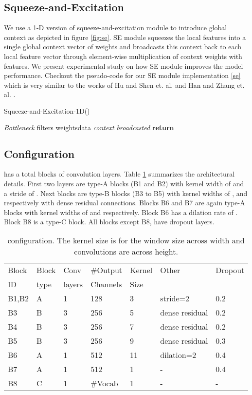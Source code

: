 \documentclass{article}
\begin{document}
\subsection{Squeeze-and-Excitation}
We use a 1-D version of squeeze-and-excitation module to introduce global context as depicted in figure \ref{fig:se}. SE module squeezes the local features into a single global context vector of weights and broadcasts this context back to each local feature vector through element-wise multiplication of context weights with features. We present experimental study on how SE module improves the model performance. Checkout the pseudo-code for our SE module implementation \ref{se} which is very similar to the works of Hu and Shen et. al.\cite{hu2018squeeze} and Han and Zhang et. al. \cite{han2020contextnet}.

    
\begin{algorithm}
\caption{Squeeze-and-Excitation-1D()}\label{se}
\begin{algorithmic}[1]
\State 
\State {}
\Comment \emph{Bottleneck}
\State 
\State filters
\State 
\State weightsdata
\Comment \emph{context broadcasted}
\State \textbf{return} {}
\EndProcedure
\end{algorithmic}
\end{algorithm}


\subsection{Configuration}
 has a total  blocks of convolution layers. Table \ref{tab:config_table} summarizes the architectural details. First two layers are type-A blocks (B1 and B2) with kernel width of  and a stride of . Next  blocks are type-B blocks (B3 to B5) with kernel widths of ,  and  respectively with dense residual connections. Blocks B6 and B7 are again type-A blocks with kernel widths of  and  respectively. Block B6 has a dilation rate of . Block B8 is a type-C block. All blocks except B8, have dropout layers. 

\begin{table}
 \caption{ configuration. The kernel size is for the window size across width and convolutions are across height.}
  \centering
  \begin{tabular}{lllllll}
    \toprule
      Block & Block & Conv & \#Output & Kernel & Other & Dropout \\
      ID & type  & layers & Channels & Size &   & \\
    \midrule
    B1,B2 & A & 1 & 128 & 3 & stride=2 & 0.2\\
B3 & B & 3 & 256 & 5 & dense residual & 0.2\\
    B4 & B & 3 & 256 & 7 & dense residual & 0.2\\
    B5 & B & 3 & 256 & 9 & dense residual & 0.3\\
    B6 & A & 1 & 512 & 11 & dilation=2 & 0.4\\
    B7 & A & 1 & 512 & 1 & - & 0.4\\
    B8 & C & 1 & \#Vocab & 1 & - & -\\
    \bottomrule
  \end{tabular}
  \label{tab:config_table}
\end{table}
\end{document}
